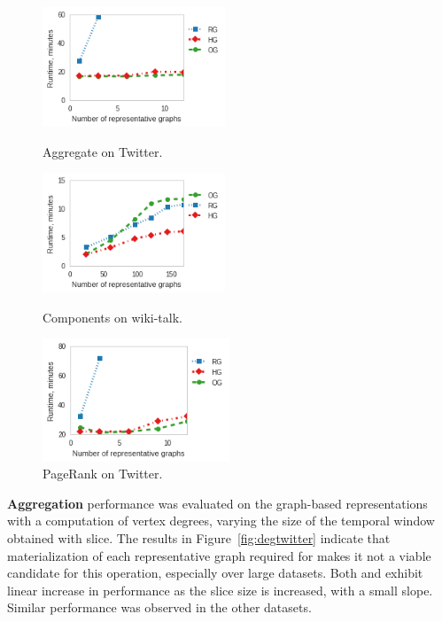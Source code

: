 \begin{figure}[t]
\centering
\begin{minipage}{2.15in}
\centering
\includegraphics[width=2.15in]{figs/deg_twitter_build14.png}
\vspace{-0.2in}
\caption{Aggregate on Twitter.}
\label{fig:degtwitter}
\vspace{-0.1in}
\end{minipage}
\begin{minipage}{2.15in}
\centering
\includegraphics[width=2.15in]{figs/cc_wikitalk_build13.png}
\vspace{-0.2in}
\caption{Components on wiki-talk.}
\label{fig:ccwiki}
\vspace{-0.1in}
\end{minipage}
\begin{minipage}{2.2in}
\centering
\includegraphics[width=2.2in]{figs/prank_twitter_build13.png}
\vspace{-0.2in}
\caption{PageRank on Twitter.}
\label{fig:pranktwitter}
\vspace{-0.1in}
\end{minipage}
\end{figure}

{\bf Aggregation} performance was evaluated on the graph-based
representations with a computation of vertex degrees, varying the size
of the temporal window obtained with slice.  The results in
Figure~\ref{fig:degtwitter} indicate that materialization of each
representative graph required for \sg makes it not a viable candidate
for this operation, especially over large datasets.  Both \og and \hg
exhibit linear increase in performance as the slice size is increased,
with a small slope.  Similar performance was observed in the other
datasets.

